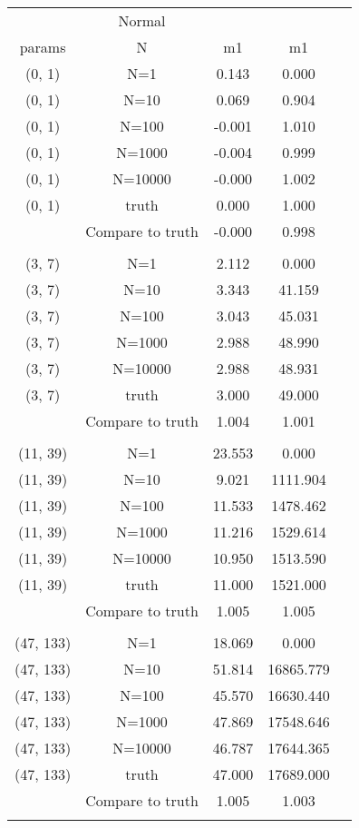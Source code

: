     \newpage
    \begin{table}[h!]
        \begin{center} {\footnotesize
        \begin{tabular}{ccccc}
        \hline
        & \multicolumn{1}{c}{ Normal }  \\
        \multicolumn{1}{c}{params} & \multicolumn{1}{c}{N} & \multicolumn{1}{c}{m1} & \multicolumn{1}{c}{m1}\\
        \hline
        
(0, 1) & N=1 & 0.143 & 0.000 \\
(0, 1) & N=10 & 0.069 & 0.904 \\
(0, 1) & N=100 & -0.001 & 1.010 \\
(0, 1) & N=1000 & -0.004 & 0.999 \\
(0, 1) & N=10000 & -0.000 & 1.002 \\
(0, 1) & truth & 0.000 & 1.000 \\
 & Compare to truth & -0.000 & 0.998 \\
\\
(3, 7) & N=1 & 2.112 & 0.000 \\
(3, 7) & N=10 & 3.343 & 41.159 \\
(3, 7) & N=100 & 3.043 & 45.031 \\
(3, 7) & N=1000 & 2.988 & 48.990 \\
(3, 7) & N=10000 & 2.988 & 48.931 \\
(3, 7) & truth & 3.000 & 49.000 \\
 & Compare to truth & 1.004 & 1.001 \\
\\
(11, 39) & N=1 & 23.553 & 0.000 \\
(11, 39) & N=10 & 9.021 & 1111.904 \\
(11, 39) & N=100 & 11.533 & 1478.462 \\
(11, 39) & N=1000 & 11.216 & 1529.614 \\
(11, 39) & N=10000 & 10.950 & 1513.590 \\
(11, 39) & truth & 11.000 & 1521.000 \\
 & Compare to truth & 1.005 & 1.005 \\
\\
(47, 133) & N=1 & 18.069 & 0.000 \\
(47, 133) & N=10 & 51.814 & 16865.779 \\
(47, 133) & N=100 & 45.570 & 16630.440 \\
(47, 133) & N=1000 & 47.869 & 17548.646 \\
(47, 133) & N=10000 & 46.787 & 17644.365 \\
(47, 133) & truth & 47.000 & 17689.000 \\
 & Compare to truth & 1.005 & 1.003 \\
\\
\hline
        \end{tabular} }
        \end{center}
        \label{turns}
    \end{table}
    


